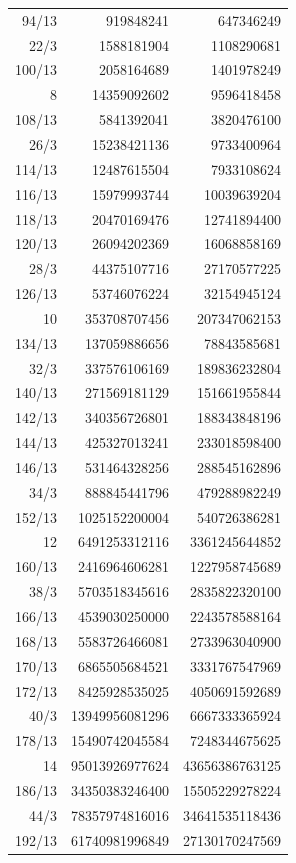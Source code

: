 \begin{longtable}{@{}rrr@{}}
94/13 & 919848241 & 647346249\\
22/3 & 1588181904 & 1108290681\\
100/13 & 2058164689 & 1401978249\\
8 & 14359092602 & 9596418458\\
108/13 & 5841392041 & 3820476100\\
26/3 & 15238421136 & 9733400964\\
114/13 & 12487615504 & 7933108624\\
116/13 & 15979993744 & 10039639204\\
118/13 & 20470169476 & 12741894400\\
120/13 & 26094202369 & 16068858169\\
28/3 & 44375107716 & 27170577225\\
126/13 & 53746076224 & 32154945124\\
10 & 353708707456 & 207347062153\\
134/13 & 137059886656 & 78843585681\\
32/3 & 337576106169 & 189836232804\\
140/13 & 271569181129 & 151661955844\\
142/13 & 340356726801 & 188343848196\\
144/13 & 425327013241 & 233018598400\\
146/13 & 531464328256 & 288545162896\\
34/3 & 888845441796 & 479288982249\\
152/13 & 1025152200004 & 540726386281\\
12 & 6491253312116 & 3361245644852\\
160/13 & 2416964606281 & 1227958745689\\
38/3 & 5703518345616 & 2835822320100\\
166/13 & 4539030250000 & 2243578588164\\
168/13 & 5583726466081 & 2733963040900\\
170/13 & 6865505684521 & 3331767547969\\
172/13 & 8425928535025 & 4050691592689\\
40/3 & 13949956081296 & 6667333365924\\
178/13 & 15490742045584 & 7248344675625\\
14 & 95013926977624 & 43656386763125\\
186/13 & 34350383246400 & 15505229278224\\
44/3 & 78357974816016 & 34641535118436\\
192/13 & 61740981996849 & 27130170247569\\

\end{longtable}
